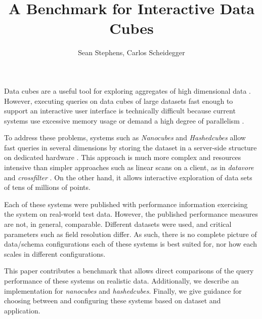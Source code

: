 \documentclass[journal]{vgtc}                %
\title{A Benchmark for Interactive Data Cubes}
\author{Sean Stephens, Carlos Scheidegger}
\begin{document}


\maketitle

Data cubes are a useful tool for exploring aggregates of high dimensional data
\cite{data_cubes}. However, executing queries on data cubes of large datasets
fast enough to support an interactive user interface is technically difficult
because current systems use excessive memory usage or demand a high degree of
parallelism \cite{nanocubes, parallel_paper}.

To address these problems, systems such as \textit{Nanocubes} and
\textit{Hashedcubes} allow fast queries in several dimensions by storing the
dataset in a server-side structure on dedicated hardware
\cite{nanocube}\cite{hashedcube}. This approach is much more complex and
resources intensive than simpler approaches such as linear scans on a client,
as in \textit{datavore} and \textit{crossfilter} \cite{datavore,crossfilter}.
On the other hand, it allows interactive exploration of data sets of tens of
millions of points. 

Each of these systems were published with performance information exercising
the system on real-world test data. However, the published performance measures
are not, in general, comparable. Different datasets were used, and critical
parameters such as field resolution differ. As such, there is no complete
picture of data/schema configurations each of these systems is best suited for,
nor how each scales in different configurations.

This paper contributes a benchmark that allows direct comparisons of the query
performance of these systems on realistic data. Additionally, we describe an
implementation for \textit{nanocubes} and \textit{hashedcubes}. Finally, we
give guidance for choosing between and configuring these systems based on
dataset and application.
\end{document}
